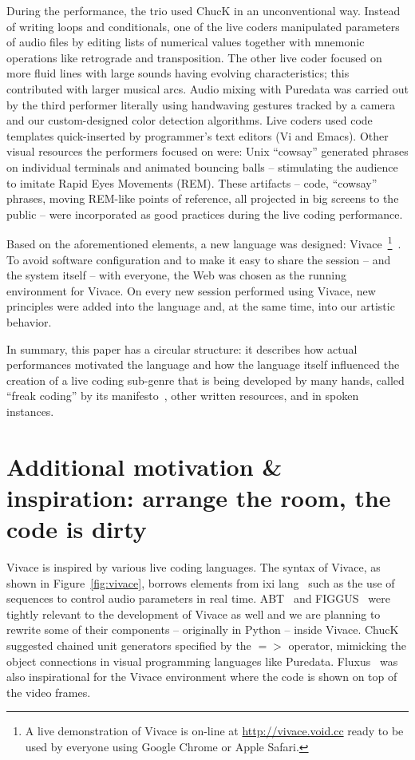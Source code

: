 \documentclass[letterpaper, 12pt]{article}
\begin{document}
During the performance, the trio used ChucK in an unconventional
way. Instead of writing loops and conditionals, one of the live coders
manipulated parameters of audio files by editing lists of numerical
values together with mnemonic operations like retrograde and
transposition.  The other live coder focused on more fluid lines with
large sounds having evolving characteristics; this contributed with
larger musical arcs.  Audio mixing with Puredata was carried out by
the third performer literally using handwaving gestures tracked by a
camera and our custom-designed color detection algorithms. Live coders
used code templates quick-inserted by programmer's text editors (Vi
and Emacs). Other visual resources the performers focused on were:
Unix ``cowsay'' generated phrases on individual terminals and animated
bouncing balls -- stimulating the audience to imitate Rapid Eyes
Movements (REM). These artifacts -- code, ``cowsay'' phrases, moving
REM-like points of reference, all projected in big screens to the
public -- were incorporated as good practices during the live coding
performance.

Based on the aforementioned elements, a new language was designed:
Vivace~\footnote{A live demonstration of Vivace is on-line at
  \url{http://vivace.void.cc} ready to be used by everyone using
  Google Chrome or Apple Safari.}~\citep{Vivace}.  To avoid software
configuration and to make it easy to share the session -- and the
system itself -- with everyone, the Web was chosen as the running
environment for Vivace. On every new session performed using Vivace,
new principles were added into the language and, at the same time,
into our artistic behavior.

In summary, this paper has a circular structure: it describes how
actual performances motivated the language and how the language itself
influenced the creation of a live coding sub-genre that is being
developed by many hands, called ``freak coding'' by its
manifesto~\citep{freak}, other written resources, and in spoken
instances.

\parskip 18pt

\section{Additional motivation \& inspiration: arrange the room, the code is dirty}

Vivace is inspired by various live coding languages. The syntax of
Vivace, as shown in Figure~\ref{fig:vivace}, borrows elements from ixi
lang~\citep{magnusson2011ixi} such as the use of sequences to control
audio parameters in real time. ABT~\citep{fabbri} and
FIGGUS~\citep{fabbri2} were tightly relevant to the development of
Vivace as well and we are planning to rewrite some of their components
-- originally in Python -- inside Vivace. ChucK suggested chained unit
generators specified by the $=>$ operator, mimicking the object
connections in visual programming languages like
Puredata. Fluxus~\citep{fluxus} was also inspirational for the Vivace
environment where the code is shown on top of the video frames.
\end{document}
